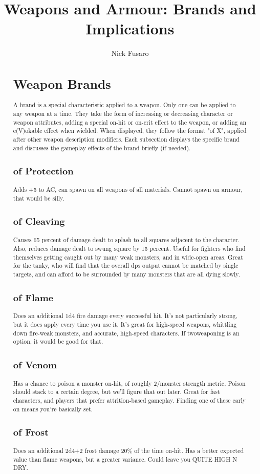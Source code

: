 \documentclass[11pt,a4paper,final]{report}
\author{Nick Fusaro}
\title{Weapons and Armour: Brands and Implications}
\begin{document}
\begin{abstract}
\section{Weapon Brands}
A brand is a special characteristic applied to a weapon. Only one can be applied to any weapon at a time. They take the form of increasing or decreasing character or weapon attributes, adding a special on-hit or on-crit effect to the weapon, or adding an e(V)okable effect when wielded. When displayed, they follow the format "of X", applied after other weapon description modifiers. Each subsection displays the specific brand and discusses the gameplay effects of the brand briefly (if needed).
\subsection{of Protection}
Adds +5 to AC, can spawn on all weapons of all materials. Cannot spawn on armour, that would be silly.
\subsection{of Cleaving}
Causes 65 percent of damage dealt to splash to all squares adjacent to the character. Also, reduces damage dealt to swung square by 15 percent. Useful for fighters who find themselves getting caught out by many weak monsters, and in wide-open areas. Great for the tanky, who will find that the overall dps output cannot be matched by single targets, and can afford to be surrounded by many monsters that are all dying slowly.
\subsection{of Flame}
Does an additional 1d4 fire damage every successful hit. It's not particularly strong, but it does apply every time you use it. It's great for high-speed weapons, whittling down fire-weak monsters, and accurate, high-speed characters. If twoweaponing is an option, it would be good for that.
\subsection{of Venom}
Has a chance to poison a monster on-hit, of roughly 2/monster strength metric. Poison should stack to a certain degree, but we'll figure that out later. Great for fast characters, and players that prefer attrition-based gameplay. Finding one of these early on means you're basically set.
\subsection{of Frost}
Does an additional 2d4+2 frost damage 20\% of the time on-hit. Has a better expected value than flame weapons, but a greater variance. Could leave you QUITE HIGH N DRY. 

\end{abstract}
\end{document}
